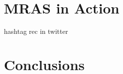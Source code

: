 \documentclass{bsu-ms}
\begin{document}
\chapter{MRAS in Action}
hashtag rec in twitter



%
%

\chapter{Conclusions}





%
%



{}
%


%
%


\appendix

\end{document}
